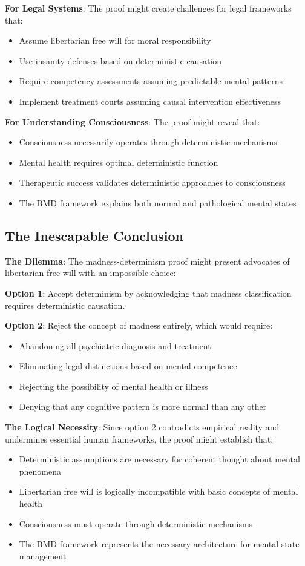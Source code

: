 \documentclass[12pt]{article}
\begin{document}
{\textbf{For Legal Systems}: The proof might create challenges for legal frameworks that:
\begin{itemize}
\item Assume libertarian free will for moral responsibility
\item Use insanity defenses based on deterministic causation
\item Require competency assessments assuming predictable mental patterns
\item Implement treatment courts assuming causal intervention effectiveness
\end{itemize}

\textbf{For Understanding Consciousness}: The proof might reveal that:
\begin{itemize}
\item Consciousness necessarily operates through deterministic mechanisms
\item Mental health requires optimal deterministic function
\item Therapeutic success validates deterministic approaches to consciousness
\item The BMD framework explains both normal and pathological mental states
\end{itemize}

\subsection{The Inescapable Conclusion}

\textbf{The Dilemma}: The madness-determinism proof might present advocates of libertarian free will with an impossible choice:

\textbf{Option 1}: Accept determinism by acknowledging that madness classification requires deterministic causation.

\textbf{Option 2}: Reject the concept of madness entirely, which would require:
\begin{itemize}
\item Abandoning all psychiatric diagnosis and treatment
\item Eliminating legal distinctions based on mental competence
\item Rejecting the possibility of mental health or illness
\item Denying that any cognitive pattern is more normal than any other
\end{itemize}

\textbf{The Logical Necessity}: Since option 2 contradicts empirical reality and undermines essential human frameworks, the proof might establish that:
\begin{itemize}
\item Deterministic assumptions are necessary for coherent thought about mental phenomena
\item Libertarian free will is logically incompatible with basic concepts of mental health
\item Consciousness must operate through deterministic mechanisms
\item The BMD framework represents the necessary architecture for mental state management
\end{itemize}

}
\end{document}
